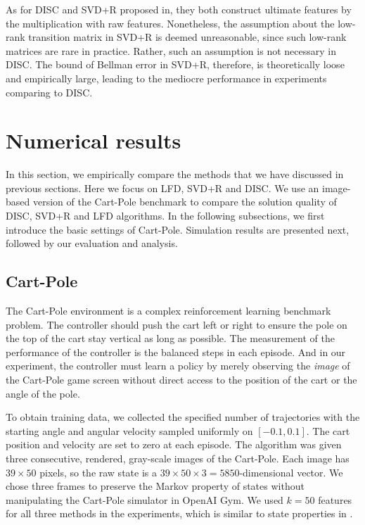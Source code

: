 \documentclass[onecolumn, conference]{IEEEtran}
\begin{document}
As for DISC and SVD+R proposed in\cite{Behzadian2019FeatureSB}, they both construct ultimate features by the multiplication with raw features. Nonetheless, the assumption about the low-rank transition matrix in SVD+R is deemed unreasonable, since such low-rank matrices are rare in practice. Rather, such an assumption is not necessary in DISC. The bound of Bellman error in SVD+R, therefore, is theoretically loose and empirically large, leading to the mediocre performance in experiments comparing to DISC.


\section{Numerical results}\label{sec:simulation}
In this section, we empirically compare the methods that we have discussed in previous sections. Here we focus on LFD, SVD+R and 
DISC. We use an image-based version of the Cart-Pole benchmark to compare the solution quality of DISC, SVD+R and LFD algorithms. In the following subsections, we first introduce the basic settings of Cart-Pole. Simulation results are presented next, followed by our evaluation and analysis.
\subsection{Cart-Pole}
The Cart-Pole environment is a complex reinforcement learning benchmark problem. The controller should push the cart left or right to 
ensure the pole on the top of the cart stay vertical as long as possible. The measurement of the performance of the controller is 
the balanced steps in each episode. 
And in our experiment, the controller must learn a policy by merely observing the \textit{image} of the Cart-Pole game 
screen without direct access to the position of the cart or the angle of the pole. 

To obtain training data, we collected the specified number of trajectories with the starting angle and angular velocity 
sampled uniformly on $[-0.1,0.1]$. The cart position and velocity are set to zero at each episode. The algorithm was
given three consecutive, rendered, gray-scale images of the Cart-Pole. Each image has $39\times50$ pixels, so the raw state is a $39\times 50\times 3 = 5850$-dimensional vector. We chose three frames to preserve the Markov property of states without manipulating the Cart-Pole simulator in OpenAI Gym. We used $k = 50$ features for all three methods in the experiments, which is similar to
state properties in \cite{Song2016LinearFE}. 
\end{document}
